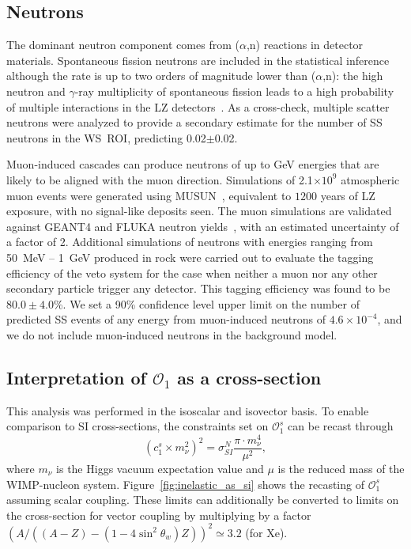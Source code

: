 \clearpage

\subsection{Neutrons}

The dominant neutron component comes from ($\alpha$,n) reactions in detector materials. 
Spontaneous fission neutrons are included in the statistical inference although the rate is up to two orders of magnitude lower than ($\alpha$,n): the high neutron and $\gamma$-ray multiplicity of spontaneous fission leads to a high probability of multiple interactions in the LZ detectors~\cite{LZ:simulations_2021}. 
As a cross-check, multiple scatter neutrons were analyzed to provide a secondary estimate for the number of SS neutrons in the WS~ROI, predicting 0.02$\pm$0.02. 

Muon-induced cascades can produce neutrons of up to GeV energies that are likely to be aligned with the muon direction.  
Simulations of 2.1$\times10^{9}$ atmospheric muon events were generated using MUSUN~\cite{Kudryavtsev:2008qh}, equivalent to $1200$ years of LZ exposure, with no signal-like deposits seen.
The muon simulations are validated against GEANT4 and FLUKA neutron yields~\cite{ARAUJO2005398, Pec:2023yic}, with an estimated uncertainty of a factor of 2. 
Additional simulations of neutrons with energies ranging from 50~MeV -- 1~GeV produced in rock were carried out to evaluate the tagging efficiency of the veto system for the case when neither a muon nor any other secondary particle trigger any detector. 
This tagging efficiency was found to be $80.0\pm4.0$\%. 
We set a 90\% confidence level upper limit on the number of predicted SS events of any energy from muon-induced neutrons of $4.6 \times 10^{-4}$, and we do not include muon-induced neutrons in the background model. 

\subsection{Interpretation of $\mathcal{O}_1$ as a cross-section}
This analysis was performed in the isoscalar and isovector basis.
To enable comparison to SI cross-sections, the constraints set on $\mathcal{O}_1^s$ can be recast through 
\begin{equation}
    (c_1^s \times m_\nu^2)^2 = \sigma^N_{SI}\frac{\pi \cdot m_\nu^4}{\mu^2},
\end{equation}
where $m_\nu$ is the Higgs vacuum expectation value and $\mu$ is the reduced mass of the WIMP-nucleon system.
Figure~\ref{fig:inelastic_as_si} shows the recasting of $\mathcal{O}_1^s$ assuming scalar coupling.
These limits can additionally be converted to limits on the cross-section for vector coupling by multiplying by a factor $(A/((A-Z)-(1-4\sin^2\theta_w)Z))^2\simeq 3.2$ (for Xe).

